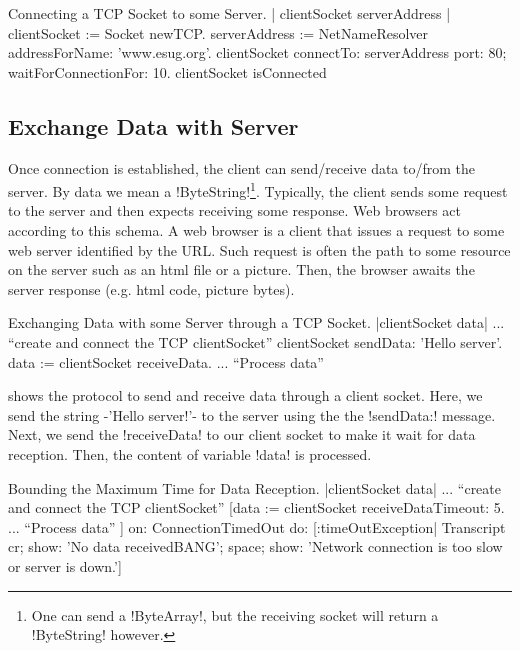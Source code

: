 \documentclass[a4paper,10pt,twoside]{book}
\begin{document}
\begin{script}[connectingTcpSocket]{Connecting a TCP Socket to some Server.}
| clientSocket serverAddress |
clientSocket := Socket newTCP.
serverAddress := NetNameResolver addressForName: 'www.esug.org'.
clientSocket 
	connectTo: serverAddress port: 80;
	waitForConnectionFor: 10.
clientSocket isConnected
\end{script}

\subsection{Exchange Data with Server}
Once connection is established, the client can send/receive data to/from the server.
By data we mean a \ct!ByteString!\footnote{One can send a \ct!ByteArray!, but the receiving socket will return a \ct!ByteString! however.}.
Typically, the client sends some request to the server and then expects receiving some response.
Web browsers act according to this schema.
A web browser is a client that issues a request to some web server identified by the URL.
Such request is often the path to some resource on the server such as an html file or a picture.
Then, the browser awaits the server response (e.g. html code, picture bytes).

\begin{script}[dataExhangeWithTcpSocket]{Exchanging Data with some Server through a TCP Socket.}
|clientSocket data|
... ``create and connect the TCP clientSocket''
clientSocket sendData: 'Hello server'.
data := clientSocket receiveData.
... ``Process data''
\end{script}

 shows the protocol to send and receive data through a client socket.
Here, we send the string \ct-'Hello server!'- to the server using the the \ct!sendData:! message.
Next, we send the \ct!receiveData! to our client socket to make it wait for data reception.
Then, the content of variable \ct!data! is processed.

\begin{script}[dataReceptionTimeOut]{Bounding the Maximum Time for Data Reception.}
|clientSocket data|
... ``create and connect the TCP clientSocket''
[data := clientSocket receiveDataTimeout: 5.
... ``Process data''
] on: ConnectionTimedOut 
do: [:timeOutException|
	Transcript 
		cr; 
		show: 'No data receivedBANG';
		space;
		show: 'Network connection is too slow or server is down.']
\end{script}
\end{document}
